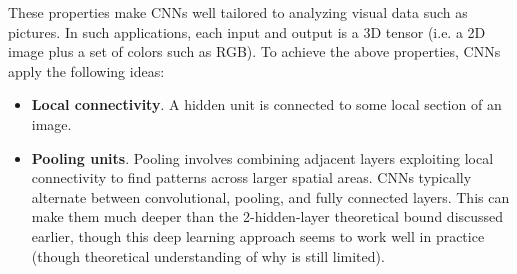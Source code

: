 \documentclass[12pt,titlepage]{article}
\begin{document}
      These properties make CNNs well tailored to analyzing visual data such as pictures. In such applications, each input and output is a 3D tensor (i.e. a 2D image plus a
      set of colors such as RGB). To achieve the above properties, CNNs apply the following ideas:
      \begin{itemize}
        \item \textbf{Local connectivity}. A hidden unit is connected to some local section of an image.
        \item \textbf{Pooling units}. Pooling involves combining adjacent layers exploiting local connectivity to find patterns across larger spatial areas. CNNs typically
          alternate between convolutional, pooling, and fully connected layers. This can make them much deeper than the 2-hidden-layer theoretical bound discussed earlier,
          though this deep learning approach seems to work well in practice (though theoretical understanding of why is still limited).
      \end{itemize}
\end{document}
